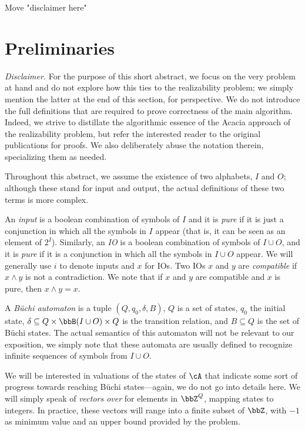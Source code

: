 \documentclass[sigconf,screen]{acmart}
\begin{document}
Move "disclaimer here"

\section{Preliminaries}

\emph{Disclaimer.} For the purpose of this short abstract, we focus on the very
problem at hand and do not explore how this ties to the realizability problem;
we simply mention the latter at the end of this section, for perspective.  We do
not introduce the full definitions that are required to prove correctness of the
main algorithm.  Indeed, we strive to distillate the algorithmic essence of the
Acacia approach of the realizability problem, but refer the interested reader to
the original publications for proofs.  We also deliberately abuse the notation
therein, specializing them as needed.

Throughout this abstract, we assume the existence of two alphabets, \(I\) and
\(O\); although these stand for input and output, the actual definitions of these
two terms is more complex.

An \emph{input} is a boolean combination of symbols of \(I\) and it is \emph{pure}
if it is just a conjunction in which all the symbols in \(I\) appear (that is, it
can be seen as an element of \(2^I\)).  Similarly, an \emph{IO} is a boolean
combination of symbols of \(I \cup O\), and it is \emph{pure} if it is a conjunction
in which all the symbols in \(I \cup O\) appear.  We will generally use \(i\) to denote
inputs and \(x\) for IOs.  Two IOs \(x\) and \(y\) are \emph{compatible} if
\(x \land y\) is not a contradiction.  We note that if \(x\) and \(y\) are compatible
and \(x\) is pure, then \(x \land y = x\).

A \emph{Büchi automaton} \cA is a tuple \((Q, q_0, \delta, B)\), \(Q\) is a set of
states, \(q_0\) the initial state,
\(\delta \subseteq Q \times \bbB(I \cup O) \times Q\) is the transition relation, and
\(B \subseteq Q\) is the set of Büchi states.  The actual semantics of this automaton will
not be relevant to our exposition, we simply note that these automata are
usually defined to recognize infinite sequences of symbols from \(I \cup O\). 

We will be interested in valuations of the states of \(\cA\) that indicate some
sort of progress towards reaching Büchi states---again, we do not go into details
here.  We will simply speak of \emph{vectors over \cA} for elements in
\(\bbZ^Q\), mapping states to integers.  In practice, these vectors will range
into a finite subset of \(\bbZ\), with \(-1\) as minimum value and an upper bound
provided by the problem.
\end{document}
